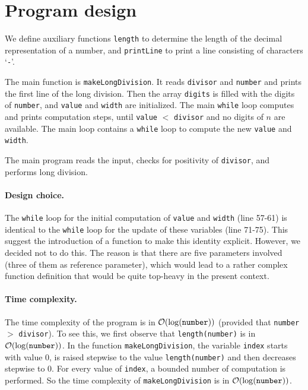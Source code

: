 \documentclass[a4paper]{article}
\begin{document}
\section{Program design}

We define auxiliary functions \verb!length! to determine the length of the decimal representation of a number, and \verb!printLine! to print a line consisting of characters `\verb!-!'.

The main function is \verb!makeLongDivision!.
It reads \verb!divisor! and \verb!number! and prints the first line of the long division.
Then the array \verb!digits! is filled with the digits of \verb!number!, and \verb!value!  and \verb!width! are initialized.
The main \verb!while! loop computes and prints computation steps, until \verb!value! $<$ \verb!divisor! and no digits of $n$ are available.
The main loop contains a \verb!while! loop to compute the new \verb!value! and \verb!width!.

The main program reads the input, checks for positivity of \verb!divisor!, and performs long division.

\paragraph{Design choice.}
The \verb!while! loop for the initial computation of \verb!value! and \verb!width! (line 57-61) is identical to the \verb!while! loop for the update of these variables (line 71-75).
This suggest the introduction of a function to make this identity explicit.
However, we decided not to do this.
The reason is that there are five parameters involved (three of them as reference parameter), which would lead to a rather complex function definition that would be quite top-heavy in the present context.

\paragraph{Time complexity.}
The time complexity of the program is in ${\cal O}(\log(\verb!number!))$ (provided that \verb!number! $>$ \verb!divisor!).
To see this, we first observe that \verb!length(number)! is in ${\cal O}(\log(\verb!number!))$.
In the function \verb!makeLongDivision!, the variable \verb!index! starts with value 0, is raised stepwise to the value \verb!length(number)! and then decreases stepwise to 0. 
For every value of \verb!index!, a bounded number of computation is performed. 
So the time complexity of \verb!makeLongDivision! is in ${\cal O}(\log(\verb!number!))$.
\end{document}
